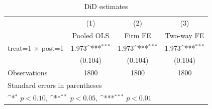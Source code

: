 \begin{table}[htbp]\centering
\def\sym#1{\ifmmode^{#1}\else\(^{#1}\)\fi}
\caption{DiD estimates}
\begin{tabular}{l*{3}{c}}
\toprule
                    &\multicolumn{1}{c}{(1)}&\multicolumn{1}{c}{(2)}&\multicolumn{1}{c}{(3)}\\
                    &\multicolumn{1}{c}{Pooled OLS}&\multicolumn{1}{c}{Firm FE}&\multicolumn{1}{c}{Two-way FE}\\
\midrule
treat=1 $\times$ post=1&       1.973\sym{***}&       1.973\sym{***}&       1.973\sym{***}\\
                    &     (0.104)         &     (0.104)         &     (0.104)         \\
\midrule
Observations        &        1800         &        1800         &        1800         \\
\bottomrule
\multicolumn{4}{l}{\footnotesize Standard errors in parentheses}\\
\multicolumn{4}{l}{\footnotesize \sym{*} \(p<0.10\), \sym{**} \(p<0.05\), \sym{***} \(p<0.01\)}\\
\end{tabular}
\end{table}
